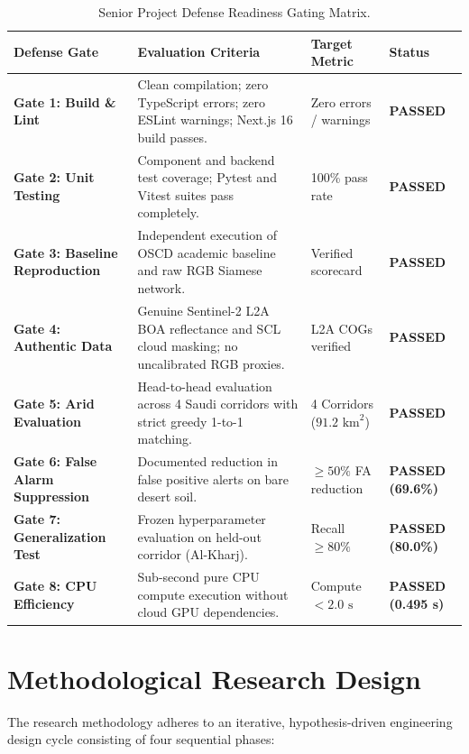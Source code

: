 \begin{table}[htbp]
\centering
\caption{Senior Project Defense Readiness Gating Matrix.}
\label{tab:defense_gates}
\begin{tabularx}{\textwidth}{@{}lXll@{}}
\toprule
\textbf{Defense Gate} & \textbf{Evaluation Criteria} & \textbf{Target Metric} & \textbf{Status} \\
\midrule
\textbf{Gate 1: Build \& Lint} & Clean compilation; zero TypeScript errors; zero ESLint warnings; Next.js 16 build passes. & Zero errors / warnings & \textbf{PASSED} \\
\textbf{Gate 2: Unit Testing} & Component and backend test coverage; Pytest and Vitest suites pass completely. & 100\% pass rate & \textbf{PASSED} \\
\textbf{Gate 3: Baseline Reproduction} & Independent execution of OSCD academic baseline and raw RGB Siamese network. & Verified scorecard & \textbf{PASSED} \\
\textbf{Gate 4: Authentic Data} & Genuine Sentinel-2 L2A BOA reflectance and SCL cloud masking; no uncalibrated RGB proxies. & L2A COGs verified & \textbf{PASSED} \\
\textbf{Gate 5: Arid Evaluation} & Head-to-head evaluation across 4 Saudi corridors with strict greedy 1-to-1 matching. & 4 Corridors ($91.2\text{ km}^2$) & \textbf{PASSED} \\
\textbf{Gate 6: False Alarm Suppression} & Documented reduction in false positive alerts on bare desert soil. & $\ge 50\%$ FA reduction & \textbf{PASSED (69.6\%)} \\
\textbf{Gate 7: Generalization Test} & Frozen hyperparameter evaluation on held-out corridor (Al-Kharj). & Recall $\ge 80\%$ & \textbf{PASSED (80.0\%)} \\
\textbf{Gate 8: CPU Efficiency} & Sub-second pure CPU compute execution without cloud GPU dependencies. & Compute $<2.0\text{ s}$ & \textbf{PASSED (0.495 s)} \\
\bottomrule
\end{tabularx}
\end{table}

\section{Methodological Research Design}
\label{sec:req_methodology_design}
The research methodology adheres to an iterative, hypothesis-driven engineering design cycle consisting of four sequential phases:

